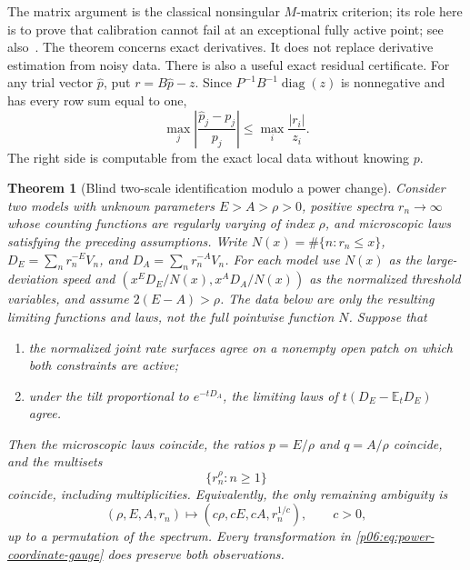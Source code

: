 \documentclass[11pt,letterpaper]{article}
\newtheorem{theorem}{Theorem}[section]
\theoremstyle{definition}
\theoremstyle{remark}
\newcommand{\1}{\mathbf 1}
\begin{document}
The matrix argument is the classical nonsingular $M$-matrix
criterion; its role here is to prove that calibration cannot fail at
an exceptional fully active point; see also~\cite{BP}. The theorem concerns exact
derivatives.  It does not replace derivative estimation from noisy data.
There is also a useful exact residual certificate.  For any trial vector
$\widehat p$, put $r=B\widehat p-z$.  Since
$P^{-1}B^{-1}\operatorname{diag}(z)$ is nonnegative and has every row
sum equal to one,
\begin{equation}\label{p06:eq:blind-calibration-certificate}
 \max_j\left|\frac{\widehat p_j-p_j}{p_j}\right|
 \le \max_i\frac{|r_i|}{z_i}.
\end{equation}
The right side is computable from the exact local data without knowing
$p$.

\begin{theorem}[Blind two-scale identification modulo a power change]
\label{p06:thm:blind-two-scale}
Consider two models with unknown parameters $E>A>\rho>0$, positive spectra
$r_n\to\infty$ whose counting functions are regularly varying of index
$\rho$, and microscopic laws satisfying the preceding assumptions.
Write $N(x)=\#\{n:r_n\le x\}$,
$D_E=\sum_n r_n^{-E}V_n$, and $D_A=\sum_n r_n^{-A}V_n$.
For each model use $N(x)$ as the large-deviation speed and
$(x^ED_E/N(x),x^AD_A/N(x))$ as the normalized threshold variables,
and assume $2(E-A)>\rho$.  The data below are only the resulting
limiting functions and laws, not the full pointwise function $N$.
Suppose that
\begin{enumerate}
\item the normalized joint rate surfaces agree on a nonempty open patch
on which both constraints are active;
\item under the tilt proportional to $e^{-tD_A}$, the limiting laws of
$t(D_E-\mathbb E_tD_E)$ agree.
\end{enumerate}
Then the microscopic laws coincide, the ratios
$p=E/\rho$ and $q=A/\rho$ coincide, and the multisets
\[
 \{r_n^\rho:n\ge1\}
\]
coincide, including multiplicities.  Equivalently, the only remaining
ambiguity is
\begin{equation}\label{p06:eq:power-coordinate-gauge}
 (\rho,E,A,r_n)\longmapsto
 (c\rho,cE,cA,r_n^{1/c}),\qquad c>0,
\end{equation}
up to a permutation of the spectrum.  Every transformation in
\eqref{p06:eq:power-coordinate-gauge} does preserve both observations.
\end{theorem}
\end{document}
